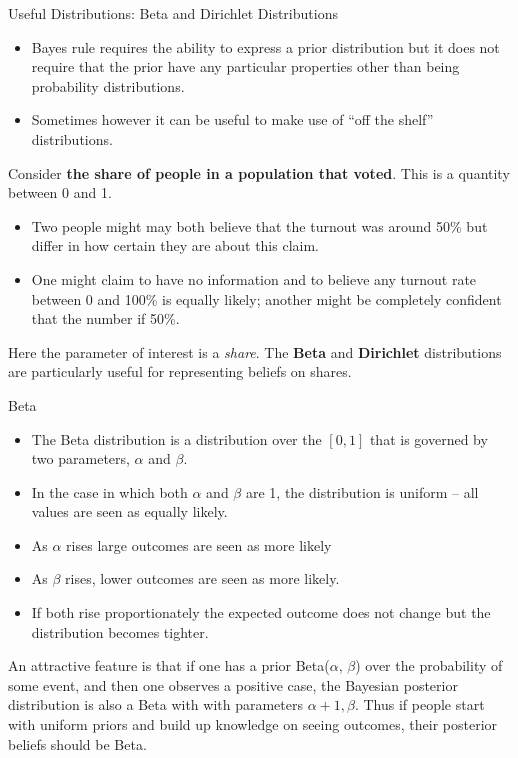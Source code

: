 \documentclass[
  11pt,
  ignorenonframetext,
]{beamer}
\providecommand{\tightlist}{%
  \setlength{\itemsep}{0pt}\setlength{\parskip}{0pt}}\usepackage{longtable,booktabs,array}
\begin{document}
\begin{frame}{Useful Distributions: Beta and Dirichlet Distributions}
\protect\hypertarget{useful-distributions-beta-and-dirichlet-distributions}{}
\begin{itemize}
\tightlist
\item
  Bayes rule requires the ability to express a prior distribution but it
  does not require that the prior have any particular properties other
  than being probability distributions.
\item
  Sometimes however it can be useful to make use of ``off the shelf''
  distributions.
\end{itemize}

Consider \textbf{the share of people in a population that voted}. This
is a quantity between 0 and 1.

\begin{itemize}
\tightlist
\item
  Two people might may both believe that the turnout was around 50\% but
  differ in how certain they are about this claim.
\item
  One might claim to have no information and to believe any turnout rate
  between 0 and 100\% is equally likely; another might be completely
  confident that the number if 50\%.
\end{itemize}

Here the parameter of interest is a \emph{share}. The \textbf{Beta} and
\textbf{Dirichlet} distributions are particularly useful for
representing beliefs on shares.
\end{frame}

\begin{frame}{Beta}
\protect\hypertarget{beta}{}
\begin{itemize}
\tightlist
\item
  The Beta distribution is a distribution over the \([0,1]\) that is
  governed by two parameters, \(\alpha\) and \(\beta\).
\item
  In the case in which both \(\alpha\) and \(\beta\) are 1, the
  distribution is uniform -- all values are seen as equally likely.
\item
  As \(\alpha\) rises large outcomes are seen as more likely
\item
  As \(\beta\) rises, lower outcomes are seen as more likely.
\item
  If both rise proportionately the expected outcome does not change but
  the distribution becomes tighter.
\end{itemize}

An attractive feature is that if one has a prior Beta(\(\alpha\),
\(\beta\)) over the probability of some event, and then one observes a
positive case, the Bayesian posterior distribution is also a Beta with
with parameters \(\alpha+1, \beta\). Thus if people start with uniform
priors and build up knowledge on seeing outcomes, their posterior
beliefs should be Beta.
\end{frame}
\end{document}
